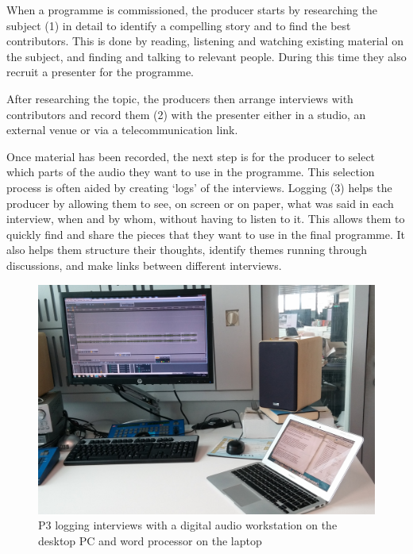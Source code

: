 When a programme is commissioned, the producer starts by researching the
subject (1) in detail to identify a compelling story and to find the best
contributors. This is done by reading, listening and watching existing material
on the subject, and finding and talking to relevant people. During this time
they also recruit a presenter for the programme.

After researching the topic, the producers then arrange interviews with
contributors and record them (2) with the presenter either in a studio, an external
venue or via a telecommunication link.


Once material has been recorded, the next step is for the producer to select which parts of the audio they want to use
in the programme.  This selection process is often aided by creating `logs' of the interviews.  Logging (3) helps the
producer by allowing them to see, on screen or on paper, what was said in each interview, when and by whom, without
having to listen to it.  This allows them to quickly find and share the pieces that they want to use in the final
programme.  It also helps them structure their thoughts, identify themes running through discussions, and make links
between different interviews.

\begin{figure}[ht]
\centering
  \includegraphics[width=\columnwidth]{figs/phil-desk.jpg}
  \caption{P3 logging interviews with a digital audio workstation on the desktop
    PC and word processor on the laptop}
  \label{fig:desk}
\end{figure}

